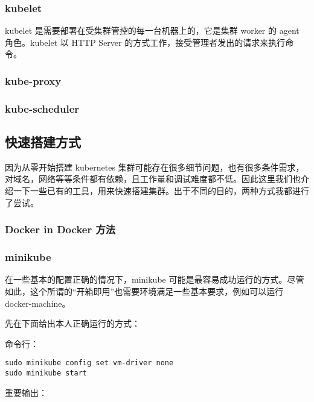 \subsubsection*{kubelet}

kubelet 是需要部署在受集群管控的每一台机器上的，它是集群 worker 的 agent 角色。kubelet 以 HTTP Server 的方式工作，接受管理者发出的请求来执行命令。

\subsubsection*{kube-proxy}

\subsubsection*{kube-scheduler}

\subsection{快速搭建方式}

因为从零开始搭建 kubernetes 集群可能存在很多细节问题，也有很多条件需求，对域名，网络等等条件都有依赖，且工作量和调试难度都不低。因此这里我们也介绍一下一些已有的工具，用来快速搭建集群。出于不同的目的，两种方式我都进行了尝试。

\subsubsection{Docker in Docker 方法}

\subsubsection{minikube}

在一些基本的配置正确的情况下，minikube 可能是最容易成功运行的方式。尽管如此，这个所谓的“开箱即用”也需要环境满足一些基本要求，例如可以运行 docker-machine。

先在下面给出本人正确运行的方式：

命令行：

\begin{lstlisting}
sudo minikube config set vm-driver none
sudo minikube start
\end{lstlisting}

重要输出：

